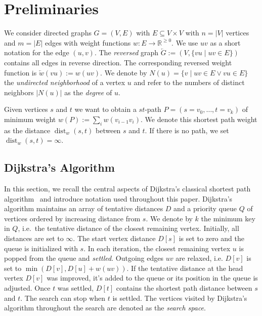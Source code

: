 \documentclass[manuscript,review]{acmart}
\newcommand*{\dist}{\operatorname{dist}}
\begin{document}
\section{Preliminaries}\label{sec:preliminaries}

We consider directed graphs $G=(V,E)$ with $E \subseteq V \times V$ with $n=|V|$ vertices and $m=|E|$ edges with weight functions $w : E \to \mathbb{R}^{\geq 0}$.
We use $uv$ as a short notation for the edge $(u,v)$.
The \emph{reversed} graph $\overleftarrow{G} := (V, \{ vu \mid uv \in E \})$ contains all edges in reverse direction.
The corresponding reversed weight function is $\overleftarrow{w}(vu) := w(uv)$.
We denote by $N(u) = \{ v \mid uv \in E \vee vu \in E \}$ the \emph{undirected neighborhood} of a vertex $u$ and refer to the numbers of distinct neighbors $|N(u)|$ as the \emph{degree} of $u$.

Given vertices $s$ and $t$ we want to obtain a $st$-path $P=(s=v_0,\dots,t=v_k)$ of minimum weight $w(P) := \sum_{i} w(v_{i-1}v_i)$.
We denote this shortest path weight as the distance $\dist_w(s,t)$ between $s$ and $t$.
If there is no path, we set $\dist_w(s,t)=\infty$. %

\subsection{Dijkstra's Algorithm}

In this section, we recall the central aspects of Dijkstra's classical shortest path algorithm~\cite{d-ntpcg-59} and introduce notation used throughout this paper.
Dijkstra's algorithm maintains an array of tentative distances $D$ and a priority queue $Q$ of vertices ordered by increasing distance from $s$.
We denote by $k$ the minimum key in $Q$, i.e.\ the tentative distance of the closest remaining vertex.
Initially, all distances are set to $\infty$.
The start vertex distance $D[s]$ is set to zero and the queue is initialized with $s$.
In each iteration, the closest remaining vertex $u$ is popped from the queue and \emph{settled}.
Outgoing edges $uv$ are relaxed, i.e. $D[v]$ is set to $\min(D[v], D[u] + w(uv))$.
If the tentative distance at the head vertex $D[v]$ was improved, it's added to the queue or its position in the queue is adjusted.
Once $t$ was settled, $D[t]$ contains the shortest path distance between $s$ and $t$.
The search can stop when $t$ is settled.
The vertices visited by Dijkstra's algorithm throughout the search are denoted as the \emph{search space}.
\end{document}
